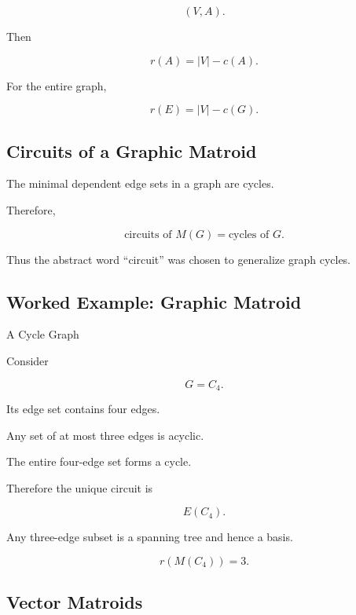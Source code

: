 \[
(V,A).
\]

Then

\[
\boxed{
r(A)
=
|V|-c(A).
}
\]

For the entire graph,

\[
\boxed{
r(E)
=
|V|-c(G).
}
\]

\subsection{Circuits of a Graphic Matroid}
\label{subsec:graphic-matroid-circuits}

The minimal dependent edge sets in a graph are cycles.

Therefore,

\[
\boxed{
\text{circuits of }M(G)
=
\text{cycles of }G.
}
\]

Thus the abstract word ``circuit'' was chosen to generalize graph
cycles.

\subsection{Worked Example: Graphic Matroid}
\label{subsec:worked-graphic-matroid}

\begin{workedexamplebox}{A Cycle Graph}

Consider

\[
G=C_4.
\]

Its edge set contains four edges.

Any set of at most three edges is acyclic.

The entire four-edge set forms a cycle.

Therefore the unique circuit is

\[
E(C_4).
\]

Any three-edge subset is a spanning tree and hence a basis.

\begin{answerbox}
\[
\boxed{
r(M(C_4))=3.
}
\]
\end{answerbox}

\end{workedexamplebox}

\subsection{Vector Matroids}
\label{subsec:vector-matroids}

